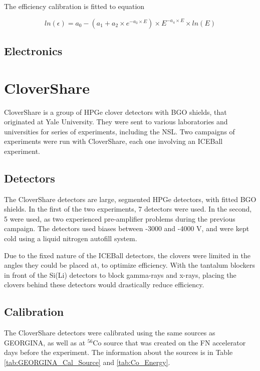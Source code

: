 The efficiency calibration is fitted to equation

\begin{equation}
    ln(\epsilon) = a_0-(a_1+a_2\times e^{-a_3\times E})\times E^{-a_4\times E}\times ln(E)
    \label{eq:Ge_Eff}
\end{equation}

\subsection{Electronics}


\section{CloverShare}

CloverShare is a group of HPGe clover detectors with BGO shields, that originated at Yale University. They were sent to various laboratories and universities for series of experiments, including the NSL. Two campaigns of experiments were run with CloverShare, each one involving an ICEBall experiment.

\subsection{Detectors}

The CloverShare detectors are large, segmented HPGe detectors, with fitted BGO shields. In the first of the two experiments, 7 detectors were used. In the second, 5 were used, as two experienced pre-amplifier problems during the previous campaign. The detectors used biases between -3000 and -4000 V, and were kept cold using a liquid nitrogen autofill system.

Due to the fixed nature of the ICEBall detectors, the clovers were limited in the angles they could be placed at, to optimize efficiency. With the tantalum blockers in front of the Si(Li) detectors to block gamma-rays and x-rays, placing the clovers behind these detectors would drastically reduce efficiency.

\subsection{Calibration}

The CloverShare detectors were calibrated using the same sources as GEORGINA, as well as at $^{56}$Co source that was created on the FN accelerator days before the experiment. The information about the sources is in Table \ref{tab:GEORGINA_Cal_Source} and \ref{tab:Co_Energy}. 

